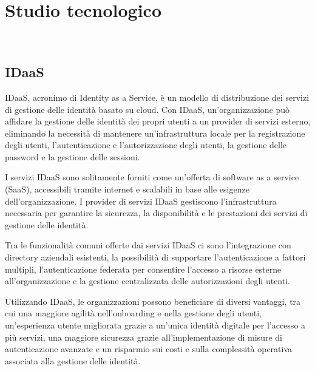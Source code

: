 
\chapter{Studio tecnologico}
\label{cap:studio-tecnologico}

\\

\section{IDaaS}

IDaaS, acronimo di Identity as a Service, è un modello di distribuzione dei servizi di gestione delle identità basato su cloud. Con IDaaS, un'organizzazione può affidare la gestione delle identità dei propri utenti a un provider di servizi esterno, eliminando la necessità di mantenere un'infrastruttura locale per la registrazione degli utenti, l'autenticazione e l'autorizzazione degli utenti, la gestione delle password e la gestione delle sessioni.

I servizi IDaaS sono solitamente forniti come un'offerta di software as a service (SaaS), accessibili tramite internet e scalabili in base alle esigenze dell'organizzazione. I provider di servizi IDaaS gestiscono l'infrastruttura necessaria per garantire la sicurezza, la disponibilità e le prestazioni dei servizi di gestione delle identità.

Tra le funzionalità comuni offerte dai servizi IDaaS ci sono l'integrazione con directory aziendali esistenti, la possibilità di supportare l'autenticazione a fattori multipli, l'autenticazione federata per consentire l'accesso a risorse esterne all'organizzazione e la gestione centralizzata delle autorizzazioni degli utenti.

Utilizzando IDaaS, le organizzazioni possono beneficiare di diversi vantaggi, tra cui una maggiore agilità nell'onboarding e nella gestione degli utenti, un'esperienza utente migliorata grazie a un'unica identità digitale per l'accesso a più servizi, una maggiore sicurezza grazie all'implementazione di misure di autenticazione avanzate e un risparmio sui costi e sulla complessità operativa associata alla gestione delle identità.
